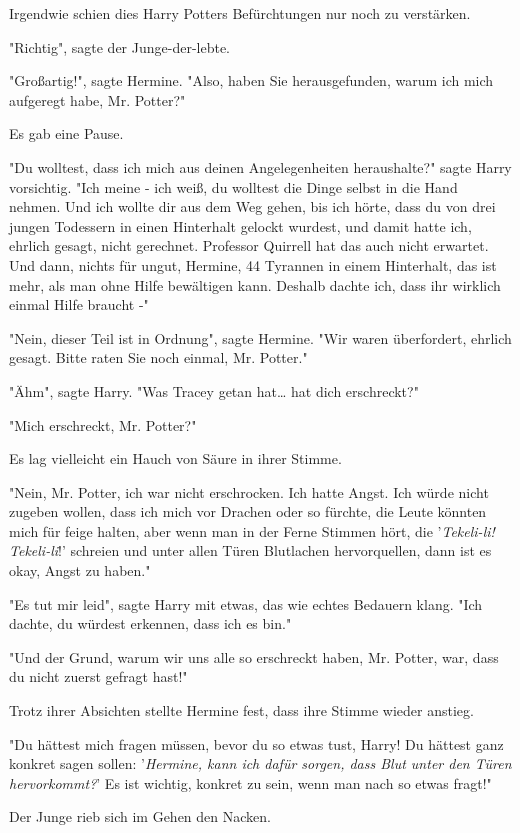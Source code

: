 {Irgendwie schien dies Harry Potters Befürchtungen nur noch zu verstärken.

"Richtig", sagte der Junge-der-lebte.

"Großartig!", sagte Hermine. "Also, haben Sie herausgefunden, warum ich mich aufgeregt habe, Mr. Potter?"

Es gab eine Pause.

"Du wolltest, dass ich mich aus deinen Angelegenheiten heraushalte?" sagte Harry vorsichtig. "Ich meine - ich weiß, du wolltest die Dinge selbst in die Hand nehmen. Und ich wollte dir aus dem Weg gehen, bis ich hörte, dass du von drei jungen Todessern in einen Hinterhalt gelockt wurdest, und damit hatte ich, ehrlich gesagt, nicht gerechnet. Professor Quirrell hat das auch nicht erwartet. Und dann, nichts für ungut, Hermine, 44 Tyrannen in einem Hinterhalt, das ist mehr, als man ohne Hilfe bewältigen kann. Deshalb dachte ich, dass ihr wirklich einmal Hilfe braucht -"

"Nein, dieser Teil ist in Ordnung", sagte Hermine. "Wir waren überfordert, ehrlich gesagt. Bitte raten Sie noch einmal, Mr. Potter."

"Ähm", sagte Harry. "Was Tracey getan hat… hat dich erschreckt?"

"Mich erschreckt, Mr. Potter?"

Es lag vielleicht ein Hauch von Säure in ihrer Stimme.

"Nein, Mr. Potter, ich war nicht erschrocken. Ich hatte Angst. Ich würde nicht zugeben wollen, dass ich mich vor Drachen oder so fürchte, die Leute könnten mich für feige halten, aber wenn man in der Ferne Stimmen hört, die '\emph{Tekeli-li! Tekeli-li}!' schreien und unter allen Türen Blutlachen hervorquellen, dann ist es okay, Angst zu haben."

"Es tut mir leid", sagte Harry mit etwas, das wie echtes Bedauern klang. "Ich dachte, du würdest erkennen, dass ich es bin."

"Und der Grund, warum wir uns alle so erschreckt haben, Mr. Potter, war, dass du nicht zuerst gefragt hast!"

Trotz ihrer Absichten stellte Hermine fest, dass ihre Stimme wieder anstieg.

"Du hättest mich fragen müssen, bevor du so etwas tust, Harry! Du hättest ganz konkret sagen sollen: '\emph{Hermine, kann ich dafür sorgen, dass Blut unter den Türen hervorkommt?}' Es ist wichtig, konkret zu sein, wenn man nach so etwas fragt!"

Der Junge rieb sich im Gehen den Nacken.

}
